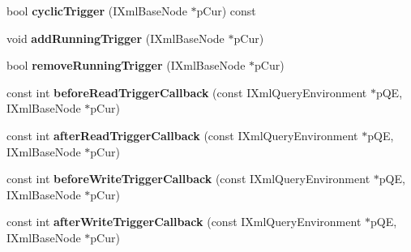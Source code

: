 \begin{DoxyCompactItemize}
\item 
\hypertarget{classgeneral__server_1_1TriggerContextDatabaseAttribute_af4f866e4922b93268f865a714cb1cd61}{bool {\bfseries cyclic\-Trigger} (\-I\-Xml\-Base\-Node $\ast$p\-Cur) const }\label{classgeneral__server_1_1TriggerContextDatabaseAttribute_af4f866e4922b93268f865a714cb1cd61}

\item 
\hypertarget{classgeneral__server_1_1TriggerContextDatabaseAttribute_a839c5c006d823a45536cb70d835bc77d}{void {\bfseries add\-Running\-Trigger} (\-I\-Xml\-Base\-Node $\ast$p\-Cur)}\label{classgeneral__server_1_1TriggerContextDatabaseAttribute_a839c5c006d823a45536cb70d835bc77d}

\item 
\hypertarget{classgeneral__server_1_1TriggerContextDatabaseAttribute_a55a0a33fff4930e784af7b082c473bbe}{bool {\bfseries remove\-Running\-Trigger} (\-I\-Xml\-Base\-Node $\ast$p\-Cur)}\label{classgeneral__server_1_1TriggerContextDatabaseAttribute_a55a0a33fff4930e784af7b082c473bbe}

\item 
\hypertarget{classgeneral__server_1_1TriggerContextDatabaseAttribute_ac7f54ae9897b59f423e53317553f5e25}{const int {\bfseries before\-Read\-Trigger\-Callback} (const \-I\-Xml\-Query\-Environment $\ast$p\-Q\-E, \-I\-Xml\-Base\-Node $\ast$p\-Cur)}\label{classgeneral__server_1_1TriggerContextDatabaseAttribute_ac7f54ae9897b59f423e53317553f5e25}

\item 
\hypertarget{classgeneral__server_1_1TriggerContextDatabaseAttribute_a8d23ce6f644a84f9d8b02b9dec6144d4}{const int {\bfseries after\-Read\-Trigger\-Callback} (const \-I\-Xml\-Query\-Environment $\ast$p\-Q\-E, \-I\-Xml\-Base\-Node $\ast$p\-Cur)}\label{classgeneral__server_1_1TriggerContextDatabaseAttribute_a8d23ce6f644a84f9d8b02b9dec6144d4}

\item 
\hypertarget{classgeneral__server_1_1TriggerContextDatabaseAttribute_aef51289f5388b81b9c1834b0d6f295bd}{const int {\bfseries before\-Write\-Trigger\-Callback} (const \-I\-Xml\-Query\-Environment $\ast$p\-Q\-E, \-I\-Xml\-Base\-Node $\ast$p\-Cur)}\label{classgeneral__server_1_1TriggerContextDatabaseAttribute_aef51289f5388b81b9c1834b0d6f295bd}

\item 
\hypertarget{classgeneral__server_1_1TriggerContextDatabaseAttribute_abbc7134b80a1c180a873b1bd34c5bd8f}{const int {\bfseries after\-Write\-Trigger\-Callback} (const \-I\-Xml\-Query\-Environment $\ast$p\-Q\-E, \-I\-Xml\-Base\-Node $\ast$p\-Cur)}\label{classgeneral__server_1_1TriggerContextDatabaseAttribute_abbc7134b80a1c180a873b1bd34c5bd8f}

\end{DoxyCompactItemize}
